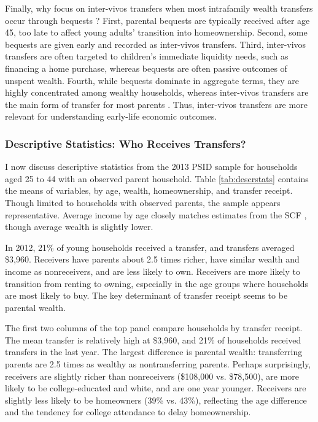 \documentclass[12pt]{article}
\begin{document}
Finally, why focus on inter-vivos transfers when most intrafamily wealth transfers occur through bequests \citep[see e.g.,][]{feiveson2019lifecycle}? First, parental bequests are typically received after age 45, too late to affect young adults' transition into homeownership. Second, some bequests are given early and recorded as inter-vivos transfers. Third, inter-vivos transfers are often targeted to children's immediate liquidity needs, such as financing a home purchase, whereas bequests are often passive outcomes of unspent wealth. Fourth, while bequests dominate in aggregate terms, they are highly concentrated among wealthy households, whereas inter-vivos transfers are the main form of transfer for most parents \citep{yang2023financial}. Thus, inter-vivos transfers are more relevant for understanding early-life economic outcomes. 


\subsubsection{Descriptive Statistics: Who Receives Transfers?}
I now discuss descriptive statistics from the 2013 PSID sample for households aged 25 to 44 with an observed parent household. Table \ref{tab:descrstats} contains the means of variables, by age, wealth, homeownership, and transfer receipt. Though limited to households with observed parents, the sample appears representative. Average income by age closely matches estimates from the SCF \cite[see e.g.,][]{kuhn20162013}, though average wealth is slightly lower.

In 2012, 21\% of young households received a transfer, and transfers averaged \$3,960. Receivers have parents about 2.5 times richer, have similar wealth and income as nonreceivers, and are less likely to own. Receivers are more likely to transition from renting to owning, especially in the age groups where households are most likely to buy. The key determinant of transfer receipt seems to be parental wealth.

The first two columns of the top panel compare households by transfer receipt. The mean transfer is relatively high at \$3,960, and 21\% of households received transfers in the last year. The largest difference is parental wealth: transferring parents are 2.5 times as wealthy as nontransferring parents. Perhaps surprisingly, receivers are slightly richer than nonreceivers (\$108,000 vs. \$78,500), are more likely to be college-educated and white, and are one year younger. Receivers are slightly less likely to be homeowners (39\% vs. 43\%), reflecting the age difference and the tendency for college attendance to delay homeownership.
\end{document}
